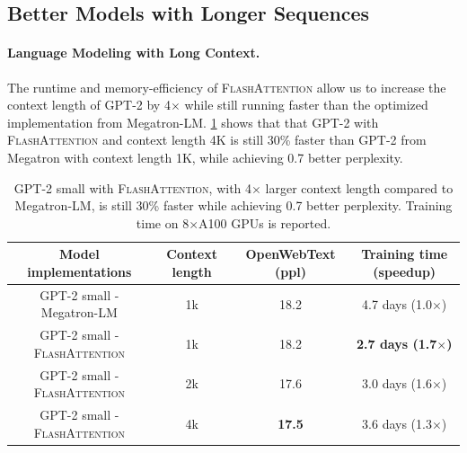 \documentclass{article}
\newcommand{\sysname}{\textsc{FlashAttention}\xspace}
\begin{document}
{\subsection{Better Models with Longer Sequences}
\label{ssec:exp_long_sequences}

\paragraph{Language Modeling with Long Context.}
The runtime and memory-efficiency of \sysname allow us to increase the context length of
GPT-2 by 4$\times$ while still running faster than the optimized
implementation from Megatron-LM.
\cref{table:gpt2_long_context} shows that that GPT-2 with \sysname and
context length 4K is still 30\% faster than GPT-2 from Megatron with context
length 1K, while achieving 0.7 better perplexity.

\begin{table}[h]
\vspace{-3mm}
  \captionsetup{font=small}
  \small
  \centering
  \caption{\label{table:gpt2_long_context}GPT-2 small with \sysname, with 4$\times$ larger context
    length compared to Megatron-LM, is still 30\% faster while achieving 0.7
    better perplexity. Training time on 8$\times$A100 GPUs is reported.}
  \setlength{\tabcolsep}{5pt}
  \vspace{1em}
  \iftoggle{arxiv}{}{
      \resizebox{0.8\linewidth}{!}
  }
  {
    \begin{tabular}{@{}c|ccc@{}}
      Model implementations & Context length &\multicolumn{1}{c}{OpenWebText (ppl)}&\multicolumn{1}{c}{Training time (speedup)} \\
    \hline
      GPT-2 small - Megatron-LM & 1k & 18.2 & 4.7 days (1.0$\times$) \\
      GPT-2 small - \sysname & 1k & 18.2 & \textbf{2.7 days (1.7$\times$)} \\
      GPT-2 small - \sysname & 2k & 17.6 & 3.0 days (1.6$\times$) \\
      GPT-2 small - \sysname & 4k & \textbf{17.5} & 3.6 days (1.3$\times$) \\
    \end{tabular}
  }
  \vspace{-3mm}
\end{table}
}{}
\end{document}
